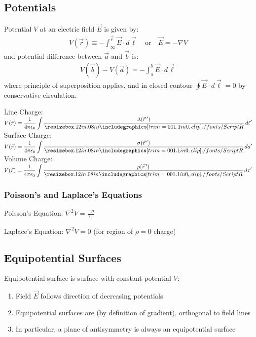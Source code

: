 \documentclass[12pt, a4paper]{article}
\begin{document}
\begin{multicols*}{3}
\colbreak
\subsection{Potentials}
Potential $V$ at an electric field $\vec{E}$ is given by:
\begin{align*}
  V(\vec{r}) \equiv -\int^{\vec{r}}_{\infty} \vec{E} \cdot d \vec{\ell} \quad\text{or}\quad \vec{E} = -\nabla V
\end{align*}
and potential difference between $\vec{a}$ and $\vec{b}$ is:
\begin{align*}
  V(\vec{b}) - V(\vec{a}) = -\int^b_a \vec{E}\cdot d \vec{\ell}
\end{align*}
where principle of superposition applies, and in closed contour $\displaystyle\oint \vec{E}\cdot d \vec{\ell} = 0$ by conservative circulation.

Line Charge: $\displaystyle V(\vec{r}) = \frac{1}{4\pi\epsilon_0}\int \frac{\lambda (\vec{r}\,')}{\sep} \, d\ell'$\\
Surface Charge: $\displaystyle V(\vec{r}) = \frac{1}{4\pi\epsilon_0}\int \frac{\sigma (\vec{r}\,')}{\sep} \, da'$\\
Volume Charge: $\displaystyle V(\vec{r}) = \frac{1}{4\pi\epsilon_0}\int \frac{\rho (\vec{r}\,')}{\sep} \, d\tau'$\\

\subsubsection{Poisson's and Laplace's Equations}

Poisson's Equation: $\displaystyle \nabla^2 V = \frac{-\rho}{\epsilon_0}$

Laplace's Equation: $\displaystyle \nabla^2 V = 0$ (for region of $\rho = 0$ charge)

\subsection{Equipotential Surfaces}

Equipotential surface is surface with constant potential $V$:
\begin{enumerate}[\roman*.]
  \item Field $\vec{E}$ follows direction of decreasing potentials
  \item Equipotential surfaces are (by definition of gradient), orthogonal to field lines
  \item In particular, a plane of antisymmetry is always an equipotential surface
\end{enumerate}
{\centering
{}
\par}
\colbreak

\end{multicols*}
\end{document}
